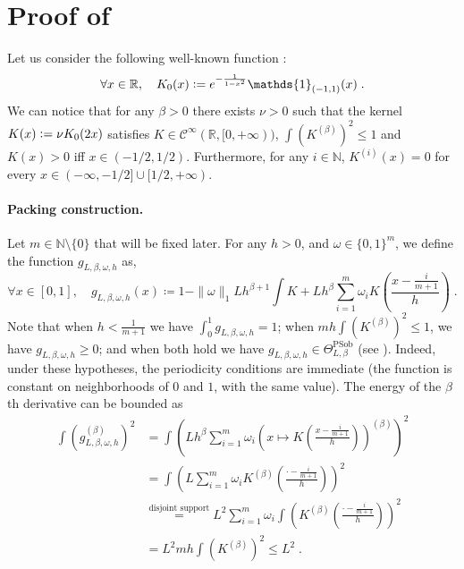 \documentclass[10pt]{article} %
\def\Ind{\mathds{1}}
\newcommand{\R}[0]{\mathbb{R}}
\newcommand{\N}[0]{\mathbb{N}}
\newcommand{\eqdef}{\vcentcolon=}
\newcommand\p[1]{\left( {#1}\right)}
\newcommand\RG[1]{\textcolor{red}{#1}}
\newcommand\mRG[1]{\marginpar{\tiny\RG{#1}}}
\begin{document}
\section{Proof of  }
\label{proofofth:sidp}

Let us consider the following well-known function :
\begin{equation*}
    \forall x \in \R, \quad K_0(x) \eqdef e^{- \frac{1}{1 - x^2}}\Ind_{(-1, 1)}(x) \;.
\end{equation*}
We can notice that for any $\beta>0$ there exists $\nu > 0$ such that the kernel $K(x) \eqdef \nu K_0(2x)$ satisfies $K \in \mathcal{C}^{\infty}(\R, [0, +\infty))$, $\int \p{K^{(\beta)}}^2 \leq 1$  %
and $K(x)>0$ iff $x \in (-1/2, 1/2)$. Furthermore, for any $i \in \N$, $K^{(i)}(x) = 0$ for every $x \in (-\infty, -1/2] \cup [1/2, +\infty)$.

\paragraph{Packing construction.}
Let $m \in \N \setminus \{0\}$ that will be fixed later. For any $h > 0$, and $\omega \in \{0, 1\}^m$, we define the function $g_{L, \beta, \omega, h}$ as,
 \begin{equation}
 \label{eq:defgkernel}
     \forall x \in [0, 1],
     \quad 
     g_{L, \beta, \omega, h}(x) \coloneqq 1 - \| \omega \|_1 L h^{\beta+1} \int K + L h^{\beta} \sum_{i=1}^m \omega_i K\p{\frac{x - \frac{i}{m+1}}{h}} \;.
\end{equation}
Note that when $h < \frac{1}{m+1}$ we have $\int_0^1 g_{L,\beta,\omega,h} =1$; when $m h \int \p{K^{(\beta)}}^2 \leq 1$, we have $g_{L,\beta,\omega,h} \geq 0$; and when both hold we have $g_{L, \beta, \omega, h} \in \Theta^{\text{PSob}}_{L, \beta}$ (see ). %
Indeed, under these hypotheses, the periodicity conditions are immediate (the function is constant on neighborhoods of $0$ and $1$, with the same value). The energy of the $\beta$th derivative can be bounded as
\begin{equation*}
\begin{aligned}
    \int \p{g_{L, \beta, \omega, h}^{(\beta)}}^2
    &= \int \p{L h^{\beta} \sum_{i=1}^m \omega_i \p{x \mapsto K\p{ \frac{x - \frac{i}{m+1}}{h}}}^{(\beta)}}^2 \\
    &= \int \p{L\sum_{i=1}^m \omega_i K^{(\beta)}\p{ \frac{\cdot - \frac{i}{m+1}}{h}}}^2 \\
    &\stackrel{\text{disjoint support}}{=} L^2 \sum_{i=1}^m \omega_i\int  \p{K^{(\beta)}\p{ \frac{\cdot - \frac{i}{m+1}}{h}}}^2 \\
    &= L^2 m h \int \p{K^{(\beta)}}^2 \leq L^2 \;.
\end{aligned}
\end{equation*}
\end{document}
